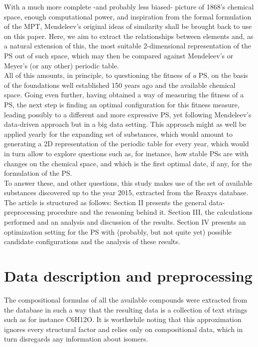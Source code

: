 \documentclass[article]{article}
\begin{document}
With a much more complete -and probably less biased- picture of 1868's chemical space, enough computational power, and inspiration from the formal formulation of the MPT, Mendeleev's original ideas of similarity shall be brought back to use on this paper. Here, we aim to extract the relationships between elements and, as a natural extension of this, the most suitable 2-dimensional representation of the PS out of such space, which may then be compared against Mendeleev's or Meyer's (or any other) periodic table. \\

All of this amounts, in principle, to questioning the fitness of \textit{a} PS, on the basis of the foundations well established 150 years ago and the available chemical space. Going even further, having obtained a way of measuring the fitness of a PS, the next step is finding an optimal configuration for this fitness measure, leading possibly to a different and more expressive PS, yet following Mendeleev's data-driven approach but in a big data setting. This approach might as well be applied yearly for the expanding set of substances, which would amount to generating a 2D representation of the periodic table for every year, which would in turn allow to explore questions such as, for instance, how stable PSs are with changes on the chemical space, and which is the first optimal date, if any, for the formulation of the PS.\\

To answer these, and other questions, this study makes use of the set of available substances discovered up to the year 2015, extracted from the Reaxys database. The article is structured as follows: Section II presents the general data-preprocessing procedure and the reasoning behind it. Section III, the calculations performed and an analysis and discussion of the results. Section IV presents an optimization setting for the PS with (probably, but not quite yet) possible candidate configurations and the analysis of these results.\\


\section{Data description and preprocessing}
\label{sec:preprocessing}

The compositional formulas of all the available compounds were extracted from the database in such a way that the resulting data is a collection of text strings such as for instance C6H12O. It is worthwhile noting that this approximation ignores every structural factor and relies only on compositional data, which in turn disregards any information about isomers.\\
\end{document}
